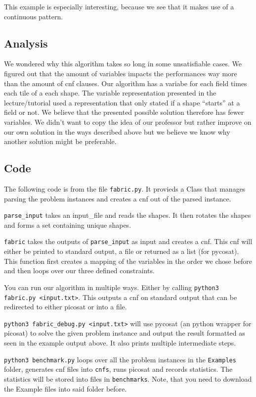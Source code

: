 \documentclass{base}
\begin{document}
This example is especially interesting, because we see that it makes use of a continuous pattern.

\subsection*{Analysis}

We wondered why this algorithm takes so long in some unsatisfiable cases.
We figured out that the amount of variables impacts the performances way more than the amount of cnf clauses.
Our algorithm has a variabe for each field times each tile of a each shape. The variable representation presented in the lecture/tutorial used a representation that only stated if a shape ``starts'' at a field or not. We believe that the presented possible solution therefore has fewer variables.
We didn't want to copy the idea of our professor but rather improve on our own solution in the ways described above but we believe we know why another solution might be preferable.

\subsection*{Code}

The following code is from the file \verb|fabric.py|. It provieds a Class that manages parsing the problem instances and creates a cnf out of the parsed instance.

\verb|parse_input| takes an input\_file and reads the shapes. It then rotates the shapes and forms a set containing unique shapes.

\verb|fabric| takes the outputs of \verb|parse_input| as input and creates a cnf. This cnf will either be printed to standard output, a file or returned as a list (for pycosat).
This function first creates a mapping of the variables in the order we chose before and then loops over our three defined constraints.


You can run our algorithm in multiple ways.
Either by calling \verb|python3 fabric.py <input.txt>|. This outputs a cnf on standard output that can be redirected to either picosat or into a file.

\verb|python3 fabric_debug.py <input.txt>| will use pycosat (an python wrapper for picosat) to solve the given problem instance and output the result formatted as seen in the example output above. It also prints multiple intermediate steps.

\verb|python3 benchmark.py| loops over all the problem instances in the \verb|Examples| folder, generates cnf files into \verb|cnfs|, runs picosat and records statistics. The statistics will be stored into files in \verb|benchmarks|. Note, that you need to download the Example files into said folder before.


\end{document}
